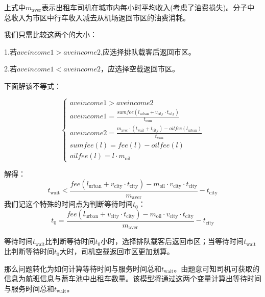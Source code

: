 \documentclass[withoutpreface,bwprint]{cumcmthesis} %
\begin{document}
上式中$m_{\mathrm{aver}}$表示出租车司机在城市内每小时平均收入(考虑了油费损失)。分子中总收入为市区中行车收入减去从机场返回市区的油费消耗。\par
\par

我们只需比较这两个的大小：

1.若$aveincome1>aveincome2$,应选择排队载客后返回市区。

2.若$aveincome1<aveincome2$，应选择空载返回市区。

下面解该不等式：\par
\begin{equation}
	\left\{
	\begin{array}{l}
		aveincome1>aveincome2                                                                                                       \\
		aveincome1=\frac{sumfee(l_{\mathrm{urban}}+v_{\mathrm{city}} \cdot t_{\mathrm{city}})}{t_{ \mathrm{sum}}}                   \\
		aveincome2=\frac{m_{\mathrm{aver}}\cdot(t_{\mathrm{wait}}+t_{\mathrm{city}})-oilfee(l_{\mathrm{urban}})}{t_{ \mathrm{sum}}} \\
		sumfee(l)=fee(l)-oilfee(l)                                                                                                  \\
		oilfee(l)=l\cdot m_{\mathrm{oil}}
	\end{array} \right.
\end{equation}

解得：
\begin{equation}
	t_{\mathrm{wait}}< \frac{fee(l_{\mathrm{urban}}+v_{\mathrm{city}} \cdot t_{\mathrm{city}})-m_{\mathrm{oil}}\cdot v_{\mathrm{city}} \cdot t_{\mathrm{city}}}{m_{\mathrm{aver}}} -t_{\mathrm{city}}
\end{equation}
我们记这个特殊的时间点为判断等待时间$t_0$：
\begin{equation}
	t_0=  \frac{fee(l_{\mathrm{urban}}+v_{\mathrm{city}} \cdot t_{\mathrm{city}})-m_{\mathrm{oil}}\cdot v_{\mathrm{city}} \cdot t_{\mathrm{city}}}{m_{\mathrm{aver}}} -t_{\mathrm{city}}
\end{equation}\par
等待时间$t_{\mathrm{wait}}$比判断等待时间$t_0$小时，选择排队载客后返回市区；当等待时间$t_{\mathrm{wait}}$比判断等待时间$t_0$大时，司机空载返回市区更加划算。\par

那么问题转化为如何计算等待时间与服务时间总和$t_{\mathrm{wait}}$。由题意可知司机可获取的信息为航班信息与蓄车池中出租车数量。该模型将通过这两个变量计算出等待时间与服务时间总和$t_{\mathrm{wait}}$。
\end{document}
